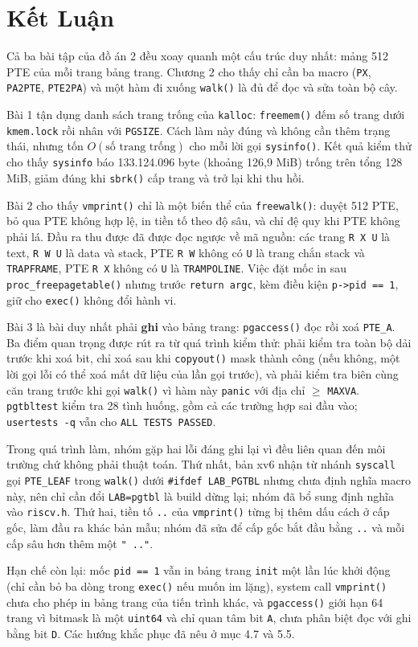 \chapter{Kết Luận}

\newpage

Cả ba bài tập của đồ án 2 đều xoay quanh một cấu trúc duy nhất: mảng 512 PTE của mỗi trang bảng trang. Chương 2 cho thấy chỉ cần ba macro (\texttt{PX}, \texttt{PA2PTE}, \texttt{PTE2PA}) và một hàm đi xuống \texttt{walk()} là đủ để đọc và sửa toàn bộ cây.

Bài 1 tận dụng danh sách trang trống của \texttt{kalloc}: \texttt{freemem()} đếm số trang dưới \texttt{kmem.lock} rồi nhân với \texttt{PGSIZE}. Cách làm này đúng và không cần thêm trạng thái, nhưng tốn $O(\text{số trang trống})$ cho mỗi lời gọi \texttt{sysinfo()}. Kết quả kiểm thử cho thấy \texttt{sysinfo} báo 133.124.096 byte (khoảng 126,9 MiB) trống trên tổng 128 MiB, giảm đúng khi \texttt{sbrk()} cấp trang và trở lại khi thu hồi.

Bài 2 cho thấy \texttt{vmprint()} chỉ là một biến thể của \texttt{freewalk()}: duyệt 512 PTE, bỏ qua PTE không hợp lệ, in tiền tố theo độ sâu, và chỉ đệ quy khi PTE không phải lá. Đầu ra thu được đã được đọc ngược về mã nguồn: các trang \texttt{R X U} là text, \texttt{R W U} là data và stack, PTE \texttt{R W} không có \texttt{U} là trang chắn stack và \texttt{TRAPFRAME}, PTE \texttt{R X} không có \texttt{U} là \texttt{TRAMPOLINE}. Việc đặt mốc in sau \texttt{proc\_freepagetable()} nhưng trước \texttt{return argc}, kèm điều kiện \texttt{p->pid == 1}, giữ cho \texttt{exec()} không đổi hành vi.

Bài 3 là bài duy nhất phải \textbf{ghi} vào bảng trang: \texttt{pgaccess()} đọc rồi xoá \texttt{PTE\_A}. Ba điểm quan trọng được rút ra từ quá trình kiểm thử: phải kiểm tra toàn bộ dải trước khi xoá bit, chỉ xoá sau khi \texttt{copyout()} mask thành công (nếu không, một lời gọi lỗi có thể xoá mất dữ liệu của lần gọi trước), và phải kiểm tra biên cùng căn trang trước khi gọi \texttt{walk()} vì hàm này \texttt{panic} với địa chỉ $\ge$ \texttt{MAXVA}. \texttt{pgtbltest} kiểm tra 28 tình huống, gồm cả các trường hợp sai đầu vào; \texttt{usertests -q} vẫn cho \texttt{ALL TESTS PASSED}.

Trong quá trình làm, nhóm gặp hai lỗi đáng ghi lại vì đều liên quan đến môi trường chứ không phải thuật toán. Thứ nhất, bản xv6 nhận từ nhánh \texttt{syscall} gọi \texttt{PTE\_LEAF} trong \texttt{walk()} dưới \texttt{\#ifdef LAB\_PGTBL} nhưng chưa định nghĩa macro này, nên chỉ cần đổi \texttt{LAB=pgtbl} là build dừng lại; nhóm đã bổ sung định nghĩa vào \texttt{riscv.h}. Thứ hai, tiền tố \texttt{..} của \texttt{vmprint()} từng bị thêm dấu cách ở cấp gốc, làm đầu ra khác bản mẫu; nhóm đã sửa để cấp gốc bắt đầu bằng \texttt{..} và mỗi cấp sâu hơn thêm một \texttt{" .."}.

Hạn chế còn lại: mốc \texttt{pid == 1} vẫn in bảng trang \texttt{init} một lần lúc khởi động (chỉ cần bỏ ba dòng trong \texttt{exec()} nếu muốn im lặng), system call \texttt{vmprint()} chưa cho phép in bảng trang của tiến trình khác, và \texttt{pgaccess()} giới hạn 64 trang vì bitmask là một \texttt{uint64} và chỉ quan tâm bit \texttt{A}, chưa phân biệt đọc với ghi bằng bit \texttt{D}. Các hướng khắc phục đã nêu ở mục 4.7 và 5.5.
